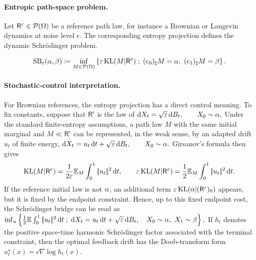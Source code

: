 \paragraph{Entropic path-space problem.}
Let $\mathsf R^\varepsilon\in\mathcal{P}(\Omega)$ be a reference path law, for instance a Brownian or Langevin dynamics at noise level $\epsilon$. The corresponding entropy projection defines the dynamic Schr\"odinger problem.

\begin{defn}\label{def-schrodinger-bridge}
\begin{equation}\label{eq-schrodinger-path-space}
\mathrm{SB}_\varepsilon(\alpha,\beta)
\coloneqq
\inf_{M\in\mathcal{P}(\Omega)}
\left\{ 
\varepsilon\operatorname{KL}(M|\mathsf R^\varepsilon)
 \;;\; 
(e_0)_\sharp M=\alpha,\ (e_1)_\sharp M=\beta
 \right\}.
\end{equation}
\end{defn}
\paragraph{Stochastic-control interpretation.}
For Brownian references, the entropy projection has a direct control meaning. To fix constants, suppose that $\mathsf R^\epsilon$ is the law of
\(\mathrm{d} X_t = \sqrt{\varepsilon}\,\mathrm{d} B_t, \qquad X_0\sim\alpha,\)
Under the standard finite-entropy assumptions, a path law $M$ with the same initial marginal and $M\ll \mathsf R^\epsilon$ can be represented, in the weak sense, by an adapted drift $u_t$ of finite energy,
\(\mathrm{d} X_t = u_t\,\mathrm{d} t+\sqrt{\varepsilon}\,\mathrm{d} B_t, \qquad X_0\sim\alpha.\)
Girsanov's formula then gives
\[
\operatorname{KL}(M|\mathsf R^\varepsilon)
=
\frac{1}{2\varepsilon}\mathbb{E}_M\int_0^1 |\!| u_t |\!|^2\,\mathrm{d} t,
\qquad
\varepsilon\operatorname{KL}(M|\mathsf R^\varepsilon)=\frac12\mathbb{E}_M\int_0^1 |\!| u_t |\!|^2\,\mathrm{d} t.
\]
If the reference initial law is not $\alpha$, an additional term $\varepsilon\operatorname{KL}(\alpha|(\mathsf R^\varepsilon)_0)$ appears, but it is fixed by the endpoint constraint. Hence, up to this fixed endpoint cost, the Schr\"odinger bridge can be read as
\(\inf_u \enscond{ \frac12\EE\int_0^1\norm{u_t}^2\,\d t }{ \d X_t=u_t\,\d t+\sqrt{\epsilon}\,\d B_t,\quad X_0\sim\al,\ X_1\sim\be },\)
If $h_t$ denotes the positive space-time harmonic Schr\"odinger factor associated with the terminal constraint, then the optimal feedback drift has the Doob-transform form
\(u_t^\star(x)=\epsilon\nabla\log h_t(x).\)
